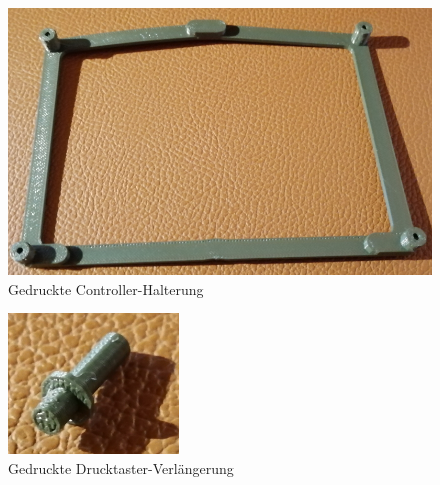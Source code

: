 \begin{minipage}[b]{0.56\textwidth}
\centering
\vspace{-6mm}
\begin{figure}[H] %
\includegraphics[width=.85\textwidth]{sec2/images/3DAnbaukomponenten/Druckbilder/ControllerHalterungDruck} 
\centering
\captionsetup{width=.95\textwidth}
\caption[Gedruckte Controller-Halterung]{Gedruckte Controller-Halterung}\centering
\label{fig:ControllerHalterungDruck}
\end{figure}
\end{minipage}
\begin{minipage}[b]{0.38\textwidth}
\vspace{-6mm}
\begin{figure}[H] %
\includegraphics[width=.8\textwidth]{sec2/images/3DAnbaukomponenten/Druckbilder/DruckTasterDruck} 
\centering
\captionsetup{width=.95\textwidth}
\caption[Gedruckte Drucktaster-Verlängerung]{Gedruckte Drucktaster-Verlängerung}
\centering
\label{fig:DruckTasterDruck}
\end{figure}
\end{minipage}


